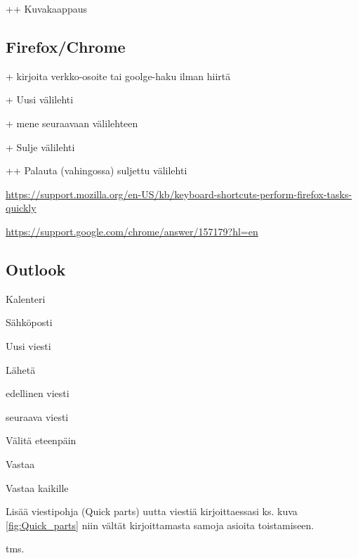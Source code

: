 \documentclass[a4paper,12pt]{scrartcl}
\begin{document}
+\keys{\shift}+ Kuvakaappaus

\subsection{Firefox/Chrome}

+ kirjoita verkko-osoite tai goolge-haku ilman hiirtä

+ Uusi välilehti

+ mene seuraavaan välilehteen

+ Sulje välilehti

+\keys{\shift}+ Palauta (vahingossa) suljettu välilehti



\url{https://support.mozilla.org/en-US/kb/keyboard-shortcuts-perform-firefox-tasks-quickly}





\url{https://support.google.com/chrome/answer/157179?hl=en}


\subsection{Outlook}

 Kalenteri

 Sähköposti

 Uusi viesti

\keys{\ctrl + \return} Lähetä

\keys{\ctrl + ,} edellinen viesti

 seuraava viesti

 Välitä eteenpäin

 Vastaa

 Vastaa kaikille



\medskip

Lisää viestipohja (Quick parts) uutta viestiä kirjoittaessasi ks. kuva \ref{fig:Quick_parts}  niin vältät kirjoittamasta samoja asioita toistamiseen.

 tms.
\end{document}
